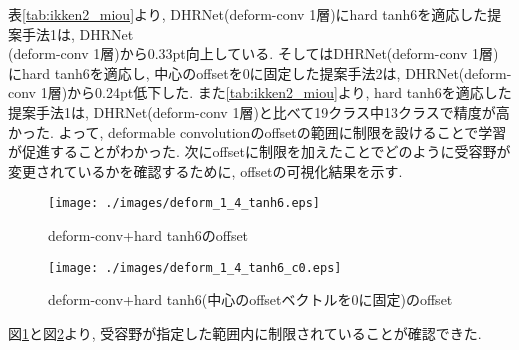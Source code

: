 表\ref{tab:ikken2_miou}より, DHRNet(deform-conv 1層)にhard tanh6を適応した提案手法1は, DHRNet\\(deform-conv 1層)から0.33pt向上している. そしてはDHRNet(deform-conv 1層)にhard tanh6を適応し, 中心のoffsetを0に固定した提案手法2は, DHRNet(deform-conv 1層)から0.24pt低下した. また\ref{tab:ikken2_miou}より, hard tanh6を適応した提案手法1は, DHRNet(deform-conv 1層)と比べて19クラス中13クラスで精度が高かった. よって, deformable convolutionのoffsetの範囲に制限を設けることで学習が促進することがわかった. 
次にoffsetに制限を加えたことでどのように受容野が変更されているかを確認するために, offsetの可視化結果を示す.

\begin{figure}[H]
    \centering
    \texttt{[image: ./images/deform\_1\_4\_tanh6.eps]}
    \caption{deform-conv+hard tanh6のoffset}
    \label{fig:deformtanh6}
\end{figure}
\begin{figure}[H]
    \centering
    \texttt{[image: ./images/deform\_1\_4\_tanh6\_c0.eps]}
    \caption{deform-conv+hard tanh6(中心のoffsetベクトルを0に固定)のoffset}
    \label{fig:deformtanh6c0}
\end{figure}

図\ref{fig:deformtanh6}と図\ref{fig:deformtanh6c0}より, 受容野が指定した範囲内に制限されていることが確認できた.